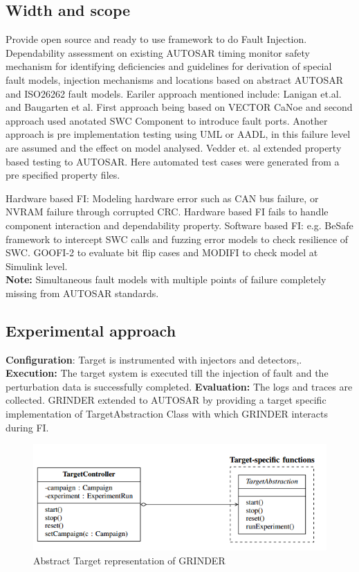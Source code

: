 \documentclass[12pt]{article} %
\begin{document}
\subsection{Width and scope} %
Provide open source and ready to use framework to do Fault Injection. Dependability  assessment on existing AUTOSAR timing monitor safety mechanism for identifying 
deficiencies and guidelines for derivation of special fault models, injection mechanisms and locations based on abstract AUTOSAR and ISO26262 fault models.
Eariler approach mentioned include: Lanigan et.al. and Baugarten et al. First approach being based on VECTOR CaNoe and second approach used anotated SWC Component to 
introduce fault ports. Another approach is pre implementation testing using UML or AADL, in this failure level are assumed and the effect on model analysed.
Vedder et. al extended property based testing to AUTOSAR. Here automated test cases were generated from a pre specified property files.

Hardware based FI: Modeling hardware error such as CAN bus failure, or NVRAM failure through corrupted CRC. Hardware based FI fails to handle component interaction and
dependability property.
Software based FI: e.g. BeSafe framework to intercept SWC calls and fuzzing error models to check resilience of SWC. GOOFI-2 to evaluate bit flip cases and  MODIFI to check model
at Simulink level.\\
\textbf{Note:} Simultaneous fault models with multiple points of failure completely missing from AUTOSAR standards.


\subsection{Experimental approach} %
\textbf{Configuration}: Target is instrumented with injectors and detectors,.
\textbf{Execution:} The target system is executed till the injection of fault and the perturbation data is successfully completed.
\textbf{Evaluation:} The logs and traces are collected.
GRINDER extended to AUTOSAR by providing a target specific implementation of TargetAbstraction Class with which GRINDER interacts during FI.

\begin{figure}
\begin{center}
	\centering
	\includegraphics[width=400pt]{Pictures/Grinder_Extension}
	\caption{Abstract Target representation of GRINDER}
\end{center}
\end{figure}
\end{document}
